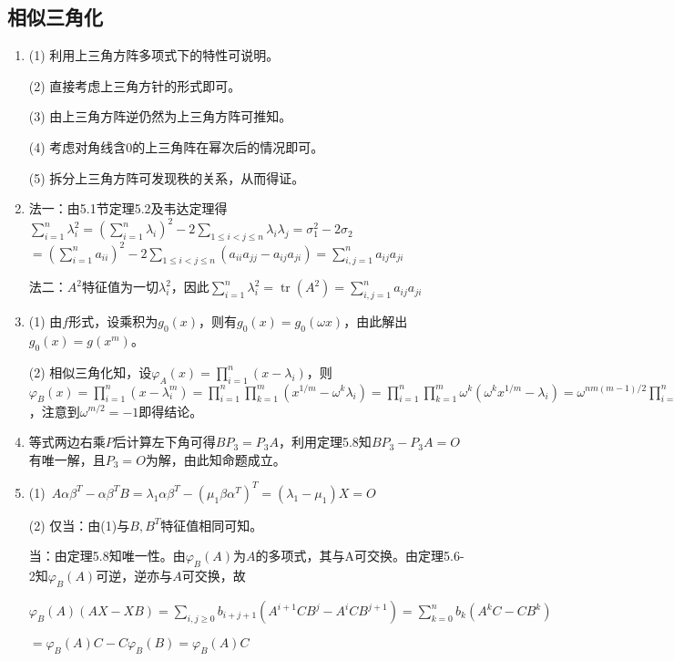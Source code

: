 \documentclass[a4paper,UTF8,fontset=windows]{ctexart}
\DeclareMathOperator{\tr}{tr}
\begin{document}
\subsection{相似三角化}
\begin{enumerate}
\item
(1) 利用上三角方阵多项式下的特性可说明。

(2) 直接考虑上三角方针的形式即可。

(3) 由上三角方阵逆仍然为上三角方阵可推知。

(4) 考虑对角线含0的上三角阵在幂次后的情况即可。

(5) 拆分上三角方阵可发现秩的关系，从而得证。

\item
法一：由5.1节定理5.2及韦达定理得$\sum_{i=1}^{n}\lambda_i^2=\left(\sum_{i=1}^{n}\lambda_i\right)^2-2\sum_{1\le i<j\le n}{\lambda_i\lambda_j}=\sigma_1^2-2\sigma_2$
$=\left(\sum_{i=1}^{n}a_{ii}\right)^2-2\sum_{1\le i<j\le n}(a_{ii}a_{jj}-a_{ij}a_{ji})=\sum_{i,j=1}^{n}{a_{ij}a_{ji}}$

法二：$A^2$特征值为一切$\lambda_i^2$，因此$\sum_{i=1}^{n}\lambda_i^2=\tr(A^2)=\sum_{i,j=1}^{n}{a_{ij}a_{ji}}$

\item
(1) 由$f$形式，设乘积为$g_0(x)$，则有$g_0(x)=g_0(\omega x)$，由此解出$g_0(x)=g(x^m)$。

(2) 相似三角化知，设$\varphi_A(x)=\prod_{i=1}^{n}(x-\lambda_i)$，则$\varphi_B(x)=\prod_{i=1}^{n}(x-\lambda_i^m)=\prod_{i=1}^{n}\prod_{k=1}^{m}(x^{1/m}-\omega^k\lambda_i)=\prod_{i=1}^{n}\prod_{k=1}^{m}\omega^k(\omega^kx^{1/m}-\lambda_i)=\omega^{nm(m-1)/2}\prod_{i=1}^{n}\varphi_A(\omega^kx^{1/m})$，注意到$\omega^{m/2}=-1$即得结论。

\item
等式两边右乘$P$后计算左下角可得$BP_3=P_3A$，利用定理5.8知$BP_3-P_3A=O$有唯一解，且$P_3=O$为解，由此知命题成立。

\item
(1)\ $A\alpha\beta^T-\alpha\beta^TB=\lambda_1\alpha\beta^T-(\mu_1\beta\alpha^T)^T=(\lambda_1-\mu_1)X=O$

(2) 仅当：由(1)与$B,B^T$特征值相同可知。

当：由定理5.8知唯一性。由$\varphi_B(A)$为$A$的多项式，其与A可交换。由定理5.6-2知$\varphi_B(A)$可逆，逆亦与$A$可交换，故

$\varphi_B(A)(AX-XB)=\sum_{i,j\ge0}b_{i+j+1}(A^{i+1}CB^j-A^iCB^{j+1})=\sum_{k=0}^{n}b_k(A^kC-CB^k)$

$=\varphi_B(A)C-C\varphi_B(B)=\varphi_B(A)C$


\end{enumerate}
\end{document}
